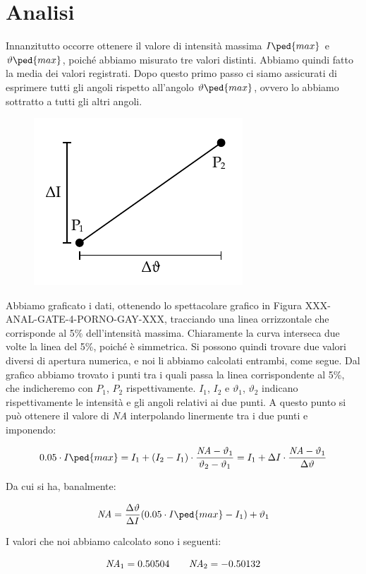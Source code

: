 \section{Analisi}

Innanzitutto occorre ottenere il valore di intensità massima $I\ped{max}$ e $\vartheta\ped{max}$, poiché abbiamo misurato tre valori distinti.
Abbiamo quindi fatto la media dei valori registrati. Dopo questo primo passo ci siamo assicurati di esprimere tutti gli angoli rispetto
all'angolo $\vartheta\ped{max}$, ovvero lo abbiamo sottratto a tutti gli altri angoli.

\begin{figure}
  \begin{center}
    \includegraphics{drawing.pdf}
  \end{center}
\end{figure}

Abbiamo graficato i dati, ottenendo lo spettacolare grafico in Figura XXX-ANAL-GATE-4-PORNO-GAY-XXX, tracciando una linea orrizzontale
che corrisponde al 5\% dell'intensità massima. Chiaramente la curva interseca due volte la linea del 5\%, poiché è simmetrica.
Si possono quindi trovare due valori diversi di apertura numerica, e noi li abbiamo calcolati entrambi, come segue.
Dal grafico abbiamo trovato i punti tra i quali passa la linea corrispondente al 5\%,
che indicheremo con $P_1$, $P_2$ rispettivamente. $I_1$, $I_2$ e $\vartheta_1$, $\vartheta_2$ indicano rispettivamente le intensità e gli angoli
relativi ai due punti. A questo punto si può ottenere il valore di \emph{NA} interpolando linermente tra i due punti e imponendo:

\begin{equation}
        0.05 \cdot I\ped{max} = I_1 + (I_2 - I_1) \cdot \frac{\emph{NA} - \vartheta_1}{\vartheta_2 - \vartheta_1} \\
                              = I_1 + \Delta I \cdot \frac{\emph{NA} - \vartheta_1}{\Delta \vartheta}
\end{equation}

Da cui si ha, banalmente:

\begin{equation}
    \emph{NA} = \frac{\Delta \vartheta}{\Delta I} (0.05 \cdot I\ped{max} - I_1) + \vartheta_1
\end{equation}

I valori che noi abbiamo calcolato sono i seguenti:

\begin{equation}
    \emph{NA}_1 = 0.50504 \qquad \emph{NA}_2 = -0.50132
\end{equation}
